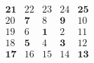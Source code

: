 \documentclass{article}
\begin{document}
	\begin{equation*}
		\begin{matrix}
			\mathbf{21} & 22         & 23         & 24         & \mathbf{25} \\
			20          & \mathbf{7} & 8          & \mathbf{9} & 10          \\
			19          & 6          & \mathbf{1} & 2          & 11          \\
			18          & \mathbf{5} & 4          & \mathbf{3} & 12          \\
			\mathbf{17} & 16         & 15         & 14         & \mathbf{13}
		\end{matrix}
	\end{equation*}
\end{document}
